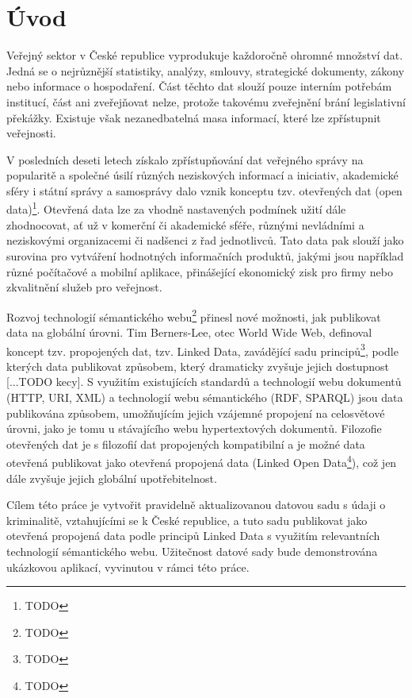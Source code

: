 \chapter*{Úvod}
Veřejný sektor v České republice vyprodukuje každoročně ohromné množství dat. Jedná se o nejrůznější statistiky, analýzy, smlouvy, strategické dokumenty, zákony nebo informace o hospodaření. Část těchto dat slouží pouze interním potřebám institucí, část ani zveřejňovat nelze, protože takovému zveřejnění brání legislativní překážky. Existuje však nezanedbatelná masa informací, které lze zpřístupnit veřejnosti.

V posledních deseti letech získalo zpřístupňování dat veřejného správy na popularitě a společné úsilí různých neziskových informací a iniciativ, akademické sféry i státní správy a samosprávy dalo vznik konceptu tzv. otevřených dat (open data)\footnote{TODO}. Otevřená data lze za vhodně nastavených podmínek užití dále zhodnocovat, ať už v komerční či akademické sféře, různými nevládními a neziskovými organizacemi či nadšenci z řad jednotlivců. Tato data pak slouží jako surovina pro vytváření hodnotných informačních produktů, jakými jsou například různé počítačové a mobilní aplikace, přinášející ekonomický zisk pro firmy nebo zkvalitnění služeb pro veřejnost.

Rozvoj technologií sémantického webu\footnote{TODO} přinesl nové možnosti, jak publikovat data na globální úrovni. Tim Berners-Lee, otec World Wide Web, definoval koncept tzv. propojených dat, tzv. Linked Data, zavádějící sadu principů\footnote{TODO}, podle kterých data publikovat způsobem, který dramaticky zvyšuje jejich dostupnost [...TODO kecy]. S využitím existujících standardů a technologií webu dokumentů (HTTP, URI, XML) a technologií webu sémantického (RDF, SPARQL) jsou data publikována způsobem, umožňujícím jejich vzájemné propojení na celosvětové úrovni, jako je tomu u stávajícího webu hypertextových dokumentů. Filozofie otevřených dat je s filozofií dat propojených kompatibilní a je možné data otevřená publikovat jako otevřená propojená data (Linked Open Data\footnote{TODO}), což jen dále zvyšuje jejich globální upotřebitelnost.

Cílem této práce je vytvořit pravidelně aktualizovanou datovou sadu s údaji o kriminalitě, vztahujícími se k České republice, a tuto sadu publikovat jako otevřená propojená data podle principů Linked Data s využitím relevantních technologií sémantického webu. Užitečnost datové sady bude demonstrována ukázkovou aplikací, vyvinutou v rámci této práce.

